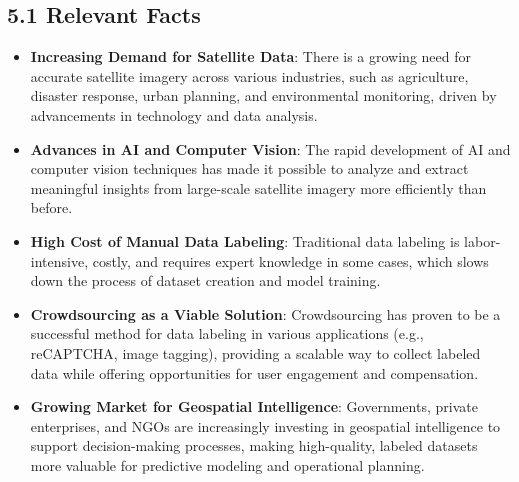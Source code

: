 \documentclass[12pt]{article}
\begin{document}
\subsection*{5.1 Relevant Facts}
\begin{itemize}
    \item \textbf{Increasing Demand for Satellite Data}: There is a growing need for accurate satellite imagery across various industries, such as agriculture, disaster response, urban planning, and environmental monitoring, driven by advancements in technology and data analysis.
    \item \textbf{Advances in AI and Computer Vision}: The rapid development of AI and computer vision techniques has made it possible to analyze and extract meaningful insights from large-scale satellite imagery more efficiently than before.
    \item \textbf{High Cost of Manual Data Labeling}: Traditional data labeling is labor-intensive, costly, and requires expert knowledge in some cases, which slows down the process of dataset creation and model training.
    \item \textbf{Crowdsourcing as a Viable Solution}: Crowdsourcing has proven to be a successful method for data labeling in various applications (e.g., reCAPTCHA, image tagging), providing a scalable way to collect labeled data while offering opportunities for user engagement and compensation.
    \item \textbf{Growing Market for Geospatial Intelligence}: Governments, private enterprises, and NGOs are increasingly investing in geospatial intelligence to support decision-making processes, making high-quality, labeled datasets more valuable for predictive modeling and operational planning.
\end{itemize}
\end{document}
